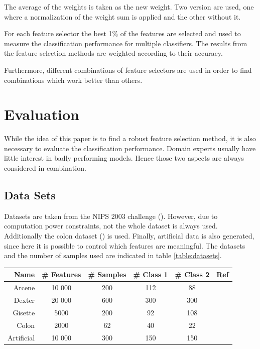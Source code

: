 \documentclass[twoside,11pt]{article}
\begin{document}
\begin{description}[align=left]
\item [Linear aggregation :] The average of the weights is taken as the new weight. Two version are used, one where a normalization of the weight sum is applied and the other without it.

\item [Performance related aggregation :] For each feature selector the best 1\% of the features are selected and used to measure the classification performance for multiple classifiers. The results from the feature selection methods are weighted according to their accuracy.
\end{description}

Furthermore, different combinations of feature selectors are used in order to find combinations which work better than others.

\section{Evaluation}

While the idea of this paper is to find a robust feature selection method, it is also necessary to evaluate the classification performance. Domain experts usually have little interest in badly performing models. Hence those two aspects are always considered in combination.

\subsection{Data Sets}
Datasets are taken from the NIPS 2003 challenge (\cite{NIPS}). However, due to computation power constraints, not the whole dataset is always used. Additionally the colon dataset (\cite{alon1999broad}) is used. Finally, artificial data is also generated, since here it is possible to control which features are meaningful. The datasets and the number of samples used are indicated in table \ref{table:datasets}.

\begin{center}
    \begin{tabular}{| r | c | c | c | c | c |}
    \hline
    Name & \# Features & \# Samples & \# Class 1 & \# Class 2 & Ref\\ \hline
    Arcene & 10 000 & 200 & 112 & 88 & \cite{NIPS} \\
    Dexter & 20 000 & 600 & 300 & 300 & \cite{NIPS} \\
    Gisette & 5000 & 200 & 92 & 108 & \cite{NIPS} \\
    Colon & 2000 & 62 & 40 & 22 &  \cite{alon1999broad} \\
    Artificial & 10 000 & 300 & 150 & 150 & \\
    \hline
    \end{tabular}
  \label{table:datasets}
\end{center}
\end{document}

